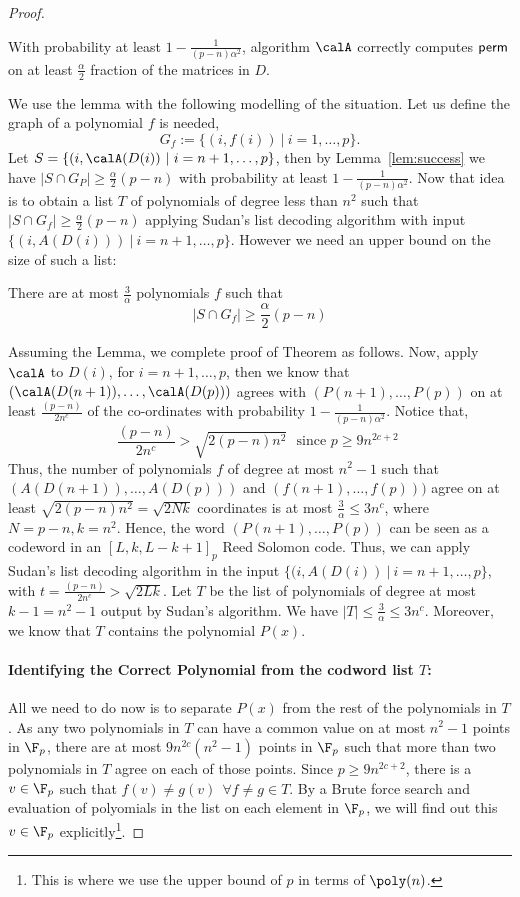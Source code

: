 \begin{proof}
\begin{lemma}
\label{lem:success}
With probability at least $1-\frac{1}{(p-n)\alpha^2}$, algorithm $\calA$ correctly computes ${\sf perm}$ on at least $\frac{\alpha}{2}$ fraction of the matrices in $D$.
\end{lemma}

We use the lemma with the following modelling of the situation. Let us define the graph of a polynomial $f$ is needed,
\[G_f := \{(i,f(i))~|~i=1,\ldots, p\}.\]
Let $S= \{(i, \calA(D(i))~|~i=n+1,\ldots, p\}$, then by  Lemma~\ref{lem:success} we have $|S\cap G_P|\ge \frac{\alpha}{2}(p-n)$ with probability at least $1-\frac{1}{(p-n)\alpha^2}$.  Now that idea is to obtain a list $T$  of polynomials of degree less than $n^2$ such that
$|S\cap G_f|\ge \frac{\alpha}{2}(p-n)$ applying Sudan's list decoding algorithm with input $\{(i, A(D(i)))~|~i=n+1,\ldots ,p\}$. However we need an  upper bound on the size of such a list:
\begin{lemma}
\label{lem:listsize}
There are at most $\frac{3}{\alpha}$ polynomials $f$ such that $$|S\cap G_f|\ge \frac{\alpha}{2}(p-n)$$
\end{lemma}
Assuming the Lemma, we complete proof of Theorem as follows.
Now, apply $\calA$ to $D(i)$, for $i=n+1,\ldots, p$, then we know that $(\calA(D(n+1)), \ldots, \calA(D(p)))$ agrees with $(P(n+1), \ldots, P(p))$ on at least $\frac{(p-n)}{2n^c}$ of  the co-ordinates with probability $1-\frac{1}{(p-n)\alpha^2}$. Notice that, 
$$\frac{(p-n)}{2n^c} > \sqrt{2(p-n)n^2} \textrm{~~since $p \ge 9n^{2c+2}$~}$$
Thus, the number of polynomials $f$ of degree at most $n^2-1$ such that $(A(D(n+1)), \ldots, A(D(p)))$ and  $(f(n+1), \ldots, f(p)))$ agree on at least $\sqrt{2(p-n)n^2}= \sqrt{2Nk}$ coordinates is at most $\frac{3}{\alpha} \le 3n^c$, where $N=p-n, k=n^2$. Hence, the word $(P(n+1), \ldots, P(p))$ can be seen as a codeword in an $[L, k, L-k+1]_p$ Reed Solomon code. Thus, we can apply Sudan's list decoding algorithm in the input $\{ (i,  A(D(i))~|~i=n+1,\ldots, p\}$, with $t=\frac{(p-n)}{2n^c} > \sqrt{2Lk}$.
Let $T$ be the list of polynomials of degree at most $k-1=n^2-1$ output by Sudan's algorithm. We have $|T|\le \frac{3}{\alpha} \le 3n^c$. Moreover, we know that $T$ contains the polynomial $P(x)$. \\[-8mm]

\paragraph{Identifying the Correct Polynomial from the codword list $T$:} All we need to do now is  to separate  $P(x)$ from the  rest of the polynomials in $T$. As any two polynomials in $T$ can have a common value on at most $n^2-1$ points in $\F_p$, there are at most $9n^{2c}(n^2-1)$ points in $\F_p$ such that more than two polynomials in $T$ agree on each of those points.  Since  $p\ge 9n^{2c+2}$,  there is a $v\in\F_p$ such that $f(v)\neq g(v)~~\forall f\neq g\in T$. By a Brute force search and evaluation of polyomials in the list on each element in $\F_p$, we will find out this $v \in \F_p$ explicitly\footnote{This is where we use the upper bound of $p$ in terms of $\poly(n)$.}. 


\end{proof}
